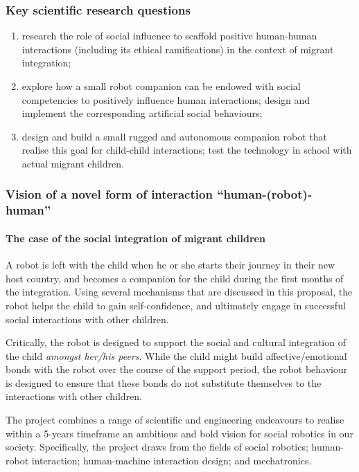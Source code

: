 \documentclass[11pt]{article}
\begin{document}
\subsubsection{Key scientific research questions}

\begin{enumerate}
\item research the role of social influence to scaffold positive human-human
    interactions (including its ethical ramifications) in the context of migrant
    integration;
\item explore how a small robot companion can be endowed with social
    competencies to positively influence human interactions; design and
    implement the corresponding artificial social behaviours;
\item design and build a small rugged and autonomous companion robot that
    realise this goal for child-child interactions; test the technology in
    school with actual migrant children.
\end{enumerate}

\subsubsection{Vision of a novel form of interaction ``human-(robot)-human''}

\paragraph{The case of the social integration of migrant children}

A robot is left with the child when he or she starts their journey in
their new host country, and becomes a companion for the child during the
first months of the integration. Using several mechanisms that are
discussed in this proposal, the robot helps the child to gain
self-confidence, and ultimately engage in successful social interactions
with other children.

Critically, the robot is designed to support the social and cultural
integration of the child \emph{amongst her/his peers}. While the child
might build affective/emotional bonds with the robot over the course of
the support period, the robot behaviour is designed to ensure that these
bonds do not substitute themselves to the interactions with other
children.

The project combines a range of scientific and engineering endeavours to
realise within a 5-years timeframe an ambitious and bold vision for
social robotics in our society. Specifically, the project draws from the
fields of social robotics; human-robot interaction; human-machine
interaction design; and mechatronics.
\end{document}
